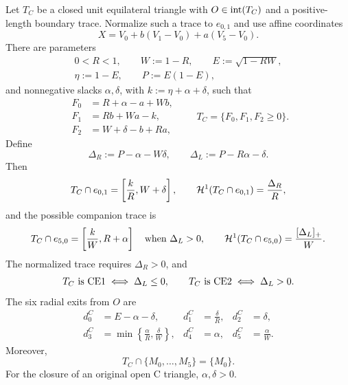 \begin{proposition}
\label{prop:signed-center-normal-form}
Let $T_C$ be a closed unit equilateral triangle with
$O\in\mathrm{int}(T_C)$ and a positive-length boundary trace.  Normalize such a
trace to $e_{0,1}$ and use affine coordinates
\[
 X=V_0+b(V_1-V_0)+a(V_5-V_0).
\]
There are parameters
\[
 \begin{gathered}
  0<R<1,\qquad W:=1-R,\qquad E:=\sqrt{1-RW},\\
  \eta:=1-E,\qquad P:=E(1-E),
 \end{gathered}
\]
and nonnegative slacks $\alpha,\delta$, with
$k:=\eta+\alpha+\delta$, such that
\begin{equation}
\begin{aligned}
 F_0&=R+\alpha-a+Wb,\\
 F_1&=Rb+Wa-k,\\
 F_2&=W+\delta-b+Ra,
\end{aligned}
\qquad T_C=\{F_0,F_1,F_2\ge0\}.
\label{eq:signed-side-slacks}
\end{equation}
Define
\begin{equation}
 \Delta_R:=P-\alpha-W\delta,
 \qquad \Delta_L:=P-R\alpha-\delta.
 \label{eq:signed-surpluses}
\end{equation}
Then
\begin{equation}
 T_C\cap e_{0,1}=\left[\frac{k}{R},W+\delta\right],
 \qquad
 \mathcal H^1(T_C\cap e_{0,1})=\frac{\Delta_R}{R},
 \label{eq:signed-right-trace}
\end{equation}
and the possible companion trace is
\begin{equation}
 T_C\cap e_{5,0}=\left[\frac{k}{W},R+\alpha\right]
 \quad\text{when }\Delta_L>0,
 \qquad
 \mathcal H^1(T_C\cap e_{5,0})=\frac{[\Delta_L]_+}{W}.
 \label{eq:signed-left-trace}
\end{equation}
The normalized trace requires $\Delta_R>0$, and
\begin{equation}
 T_C\text{ is }\mathrm{CE1}\iff\Delta_L\le0,
 \qquad
 T_C\text{ is }\mathrm{CE2}\iff\Delta_L>0.
 \label{eq:signed-classification}
\end{equation}
The six radial exits from $O$ are
\begin{equation}
\begin{aligned}
 d_0^C&=E-\alpha-\delta,&
 d_1^C&=\frac{\delta}{R},&
 d_2^C&=\delta,\\
 d_3^C&=\min\left\{\frac{\alpha}{R},\frac{\delta}{W}\right\},&
 d_4^C&=\alpha,&
 d_5^C&=\frac{\alpha}{W}.
\end{aligned}
\label{eq:signed-center-exits}
\end{equation}
Moreover,
\begin{equation}
 T_C\cap\{M_0,\ldots,M_5\}=\{M_0\}.
 \label{eq:signed-unique-center-midpoint}
\end{equation}
For the closure of an original open C triangle, $\alpha,\delta>0$.
\end{proposition}

